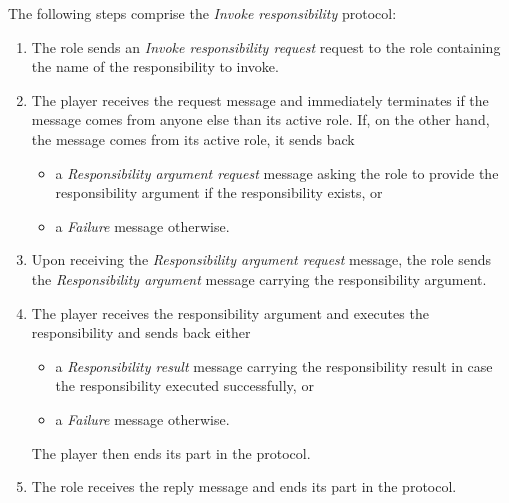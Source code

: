 The following steps comprise the \textit{Invoke responsibility} protocol:
\begin{enumerate}
	\item The role sends an \textit{Invoke responsibility request} request to the role containing the name of the responsibility to invoke.
	\item The player receives the request message and immediately terminates if the message comes from anyone else than its active role.
	If, on the other hand, the message comes from its active role, it sends back 
	\begin{itemize}
		\item a \textit{Responsibility argument request} message asking the role to provide the responsibility argument if the responsibility exists, or
		\item a \textit{Failure} message otherwise. 
	\end{itemize}
	\item Upon receiving the \textit{Responsibility argument request} message, the role sends the \textit{Responsibility argument} message carrying the responsibility argument.
	\item The player receives the responsibility argument and executes the responsibility and sends back either
	\begin{itemize}
		\item a \textit{Responsibility result} message carrying the responsibility result in case the responsibility executed successfully, or
		\item a \textit{Failure} message otherwise.
	\end{itemize}
	The player then ends its part in the protocol.
	\item The role receives the reply message and ends its part in the protocol.
\end{enumerate}